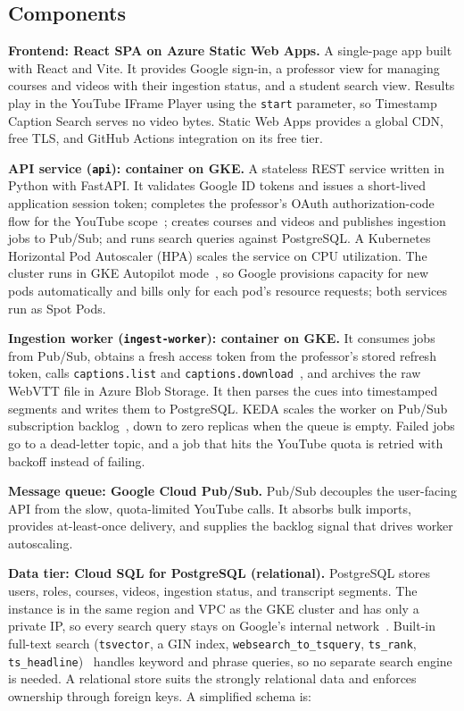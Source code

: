 \documentclass[conference]{IEEEtran}
\begin{document}
\subsection{Components}

\textbf{Frontend: React SPA on Azure Static Web Apps.} A single-page app built with React and Vite. It provides Google sign-in, a professor view for managing courses and videos with their ingestion status, and a student search view. Results play in the YouTube IFrame Player using the \texttt{start} parameter, so Timestamp Caption Search serves no video bytes. Static Web Apps provides a global CDN, free TLS, and GitHub Actions integration on its free tier.

\textbf{API service (\texttt{api}): container on GKE.} A stateless REST service written in Python with FastAPI. It validates Google ID tokens and issues a short-lived application session token; completes the professor's OAuth authorization-code flow for the YouTube scope~\cite{yt-auth}; creates courses and videos and publishes ingestion jobs to Pub/Sub; and runs search queries against PostgreSQL. A Kubernetes Horizontal Pod Autoscaler (HPA) scales the service on CPU utilization. The cluster runs in GKE Autopilot mode~\cite{gke-autopilot}, so Google provisions capacity for new pods automatically and bills only for each pod's resource requests; both services run as Spot Pods.

\textbf{Ingestion worker (\texttt{ingest-worker}): container on GKE.} It consumes jobs from Pub/Sub, obtains a fresh access token from the professor's stored refresh token, calls \texttt{captions.list} and \texttt{captions.download}~\cite{yt-captions}, and archives the raw WebVTT file in Azure Blob Storage. It then parses the cues into timestamped segments and writes them to PostgreSQL. KEDA scales the worker on Pub/Sub subscription backlog~\cite{keda-pubsub}, down to zero replicas when the queue is empty. Failed jobs go to a dead-letter topic, and a job that hits the YouTube quota is retried with backoff instead of failing.

\textbf{Message queue: Google Cloud Pub/Sub.} Pub/Sub decouples the user-facing API from the slow, quota-limited YouTube calls. It absorbs bulk imports, provides at-least-once delivery, and supplies the backlog signal that drives worker autoscaling.

\textbf{Data tier: Cloud SQL for PostgreSQL (relational).} PostgreSQL stores users, roles, courses, videos, ingestion status, and transcript segments. The instance is in the same region and VPC as the GKE cluster and has only a private IP, so every search query stays on Google's internal network~\cite{cloudsql-gke}. Built-in full-text search (\texttt{tsvector}, a GIN index, \texttt{websearch\_to\_tsquery}, \texttt{ts\_rank}, \texttt{ts\_headline})~\cite{pg-fts} handles keyword and phrase queries, so no separate search engine is needed. A relational store suits the strongly relational data and enforces ownership through foreign keys. A simplified schema is:
\end{document}
